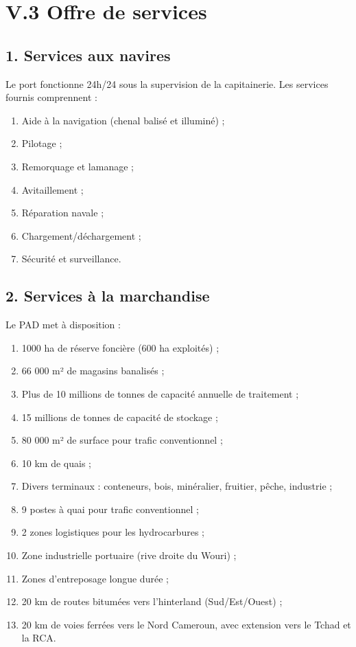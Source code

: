 \documentclass[a4paper,12pt,openany]{report}
\begin{document}
	\section*{V.3 Offre de services}
	
	\subsection*{1. Services aux navires}
	
	Le port fonctionne 24h/24 sous la supervision de la capitainerie. Les services fournis comprennent :
	\begin{enumerate}
		\item Aide à la navigation (chenal balisé et illuminé) ;
		\item Pilotage ;
		\item Remorquage et lamanage ;
		\item Avitaillement ;
		\item Réparation navale ;
		\item Chargement/déchargement ;
		\item Sécurité et surveillance.
	\end{enumerate}
	
	\subsection*{2. Services à la marchandise}
	
	Le PAD met à disposition :
	\begin{enumerate}
		\item 1000 ha de réserve foncière (600 ha exploités) ;
		\item 66 000 m² de magasins banalisés ;
		\item Plus de 10 millions de tonnes de capacité annuelle de traitement ;
		\item 15 millions de tonnes de capacité de stockage ;
		\item 80 000 m² de surface pour trafic conventionnel ;
		\item 10 km de quais ;
		\item Divers terminaux : conteneurs, bois, minéralier, fruitier, pêche, industrie ;
		\item 9 postes à quai pour trafic conventionnel ;
		\item 2 zones logistiques pour les hydrocarbures ;
		\item Zone industrielle portuaire (rive droite du Wouri) ;
		\item Zones d’entreposage longue durée ;
		\item 20 km de routes bitumées vers l’hinterland (Sud/Est/Ouest) ;
		\item 20 km de voies ferrées vers le Nord Cameroun, avec extension vers le Tchad et la RCA.
	\end{enumerate}
	
\end{document}
